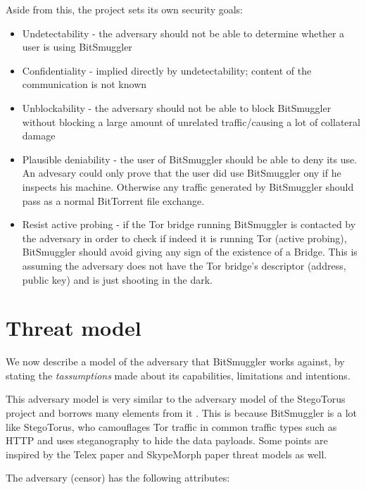 \documentclass[11pt]{article} %
\newcommand{\projectName}{BitSmuggler }
\begin{document}
Aside from this, the project sets its own security goals: 
\begin{itemize}
\item Undetectability - the adversary should not be able to determine whether a user is using \projectName
\item Confidentiality - implied directly by undetectability; content of the communication is not known
\item Unblockability - the adversary should not be able to block \projectName without blocking a large amount of unrelated traffic/causing a lot of collateral damage
\item Plausible deniability - the user of \projectName should be able to deny its use. An advesary could only prove that the user did use \projectName ony if he inspects his machine. Otherwise any traffic generated by \projectName should pass as a normal BitTorrent file exchange.
\item Resist active probing - if the Tor bridge running \projectName is contacted by the adversary in order to check if indeed it is running Tor (active probing), \projectName should avoid giving any sign of the existence of a Bridge. This is assuming the adversary does not have the Tor bridge's descriptor (address, public key) and is just shooting in the dark.
\end{itemize}

\section{Threat model}

We now describe a model of the adversary that \projectName works against, by stating the \textit{tassumptions} made about its capabilities, limitations and intentions.

This adversary model is very similar to the adversary model of the StegoTorus project  \citep*{stegotorus} and borrows many elements from it . This is because \projectName  is a lot like StegoTorus, who camouflages Tor traffic in common traffic types such as HTTP and uses steganography to hide the data payloads. Some points are inspired by the Telex paper \citep*{telex11} and SkypeMorph paper \citep*{skypeMorph} threat models as well.

The adversary (censor) has the following attributes:
\end{document}
